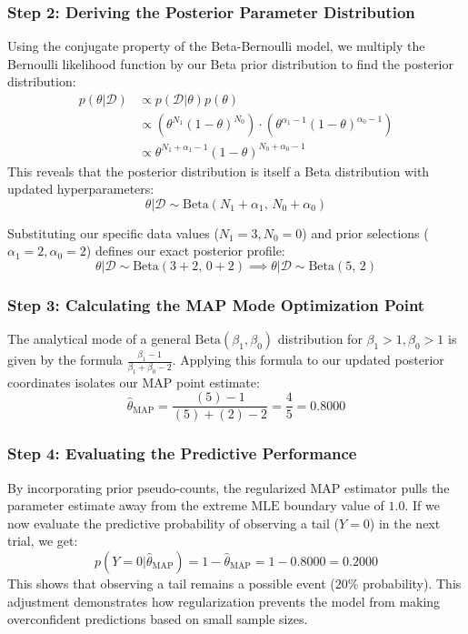 \documentclass{article}
\begin{document}
\subsubsection{Step 2: Deriving the Posterior Parameter Distribution}
Using the conjugate property of the Beta-Bernoulli model, we multiply the Bernoulli likelihood function by our Beta prior distribution to find the posterior distribution:
\begin{align}
p(\theta | \mathcal{D}) &\propto p(\mathcal{D} | \theta) p(\theta) \\
&\propto \left( \theta^{N_1} (1 - \theta)^{N_0} \right) \cdot \left( \theta^{\alpha_1 - 1} (1 - \theta)^{\alpha_0 - 1} \right) \\
&\propto \theta^{N_1 + \alpha_1 - 1} (1 - \theta)^{N_0 + \alpha_0 - 1}
\end{align}
This reveals that the posterior distribution is itself a Beta distribution with updated hyperparameters:
\begin{equation}
\theta | \mathcal{D} \sim \text{Beta}(N_1 + \alpha_1, \, N_0 + \alpha_0)
\end{equation}

Substituting our specific data values ($N_1 = 3, N_0 = 0$) and prior selections ($\alpha_1 = 2, \alpha_0 = 2$) defines our exact posterior profile:
\begin{equation}
\theta | \mathcal{D} \sim \text{Beta}(3 + 2, \, 0 + 2) \implies \theta | \mathcal{D} \sim \text{Beta}(5, \, 2)
\end{equation}

\subsubsection{Step 3: Calculating the MAP Mode Optimization Point}
The analytical mode of a general $\text{Beta}(\beta_1, \beta_0)$ distribution for $\beta_1 > 1, \beta_0 > 1$ is given by the formula $\frac{\beta_1 - 1}{\beta_1 + \beta_0 - 2}$. Applying this formula to our updated posterior coordinates isolates our $\text{MAP}$ point estimate:
\begin{equation}
\hat{\theta}_{\text{MAP}} = \frac{(5) - 1}{(5) + (2) - 2} = \frac{4}{5} = \mathbf{0.8000}
\end{equation}

\subsubsection{Step 4: Evaluating the Predictive Performance}
By incorporating prior pseudo-counts, the regularized $\text{MAP}$ estimator pulls the parameter estimate away from the extreme $\text{MLE}$ boundary value of $1.0$. If we now evaluate the predictive probability of observing a tail ($Y = 0$) in the next trial, we get:
\begin{equation}
p(Y = 0 | \hat{\theta}_{\text{MAP}}) = 1 - \hat{\theta}_{\text{MAP}} = 1 - 0.8000 = \mathbf{0.2000}
\end{equation}
This shows that observing a tail remains a possible event ($20\%$ probability). This adjustment demonstrates how regularization prevents the model from making overconfident predictions based on small sample sizes.
\end{document}
